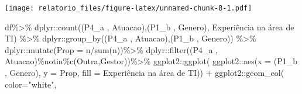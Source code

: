 \documentclass[
]{article}
\newenvironment{Shaded}{\begin{snugshade}}{\end{snugshade}}
\newcommand{\AttributeTok}[1]{\textcolor[rgb]{0.77,0.63,0.00}{#1}}
\newcommand{\FunctionTok}[1]{\textcolor[rgb]{0.00,0.00,0.00}{#1}}
\newcommand{\NormalTok}[1]{#1}
\newcommand{\SpecialCharTok}[1]{\textcolor[rgb]{0.00,0.00,0.00}{#1}}
\newcommand{\StringTok}[1]{\textcolor[rgb]{0.31,0.60,0.02}{#1}}
\begin{document}
\texttt{[image: relatorio\_files/figure-latex/unnamed-chunk-8-1.pdf]}

\begin{Shaded}
\begin{Highlighting}[]
\NormalTok{df}\SpecialCharTok{\%\textgreater{}\%}
\NormalTok{  dplyr}\SpecialCharTok{::}\FunctionTok{count}\NormalTok{(}\StringTok{\textasciigrave{}}\AttributeTok{(\textquotesingle{}P4\_a \textquotesingle{}, \textquotesingle{}Atuacao\textquotesingle{})}\StringTok{\textasciigrave{}}\NormalTok{,}\StringTok{\textasciigrave{}}\AttributeTok{(\textquotesingle{}P1\_b \textquotesingle{}, \textquotesingle{}Genero\textquotesingle{})}\StringTok{\textasciigrave{}}\NormalTok{, }\StringTok{\textasciigrave{}}\AttributeTok{Experiência na área de TI}\StringTok{\textasciigrave{}}\NormalTok{) }\SpecialCharTok{\%\textgreater{}\%}
\NormalTok{  dplyr}\SpecialCharTok{::}\FunctionTok{group\_by}\NormalTok{(}\StringTok{\textasciigrave{}}\AttributeTok{(\textquotesingle{}P4\_a \textquotesingle{}, \textquotesingle{}Atuacao\textquotesingle{})}\StringTok{\textasciigrave{}}\NormalTok{,}\StringTok{\textasciigrave{}}\AttributeTok{(\textquotesingle{}P1\_b \textquotesingle{}, \textquotesingle{}Genero\textquotesingle{})}\StringTok{\textasciigrave{}}\NormalTok{) }\SpecialCharTok{\%\textgreater{}\%}
\NormalTok{  dplyr}\SpecialCharTok{::}\FunctionTok{mutate}\NormalTok{(}\AttributeTok{Prop =}\NormalTok{ n}\SpecialCharTok{/}\FunctionTok{sum}\NormalTok{(n))}\SpecialCharTok{\%\textgreater{}\%}
\NormalTok{  dplyr}\SpecialCharTok{::}\FunctionTok{filter}\NormalTok{(}\StringTok{\textasciigrave{}}\AttributeTok{(\textquotesingle{}P4\_a \textquotesingle{}, \textquotesingle{}Atuacao\textquotesingle{})}\StringTok{\textasciigrave{}}\SpecialCharTok{\%notin\%}\FunctionTok{c}\NormalTok{(}\StringTok{\textquotesingle{}Outra\textquotesingle{}}\NormalTok{,}\StringTok{\textquotesingle{}Gestor\textquotesingle{}}\NormalTok{))}\SpecialCharTok{\%\textgreater{}\%}
\NormalTok{  ggplot2}\SpecialCharTok{::}\FunctionTok{ggplot}\NormalTok{(}
\NormalTok{    ggplot2}\SpecialCharTok{::}\FunctionTok{aes}\NormalTok{(}\AttributeTok{x =} \StringTok{\textasciigrave{}}\AttributeTok{(\textquotesingle{}P1\_b \textquotesingle{}, \textquotesingle{}Genero\textquotesingle{})}\StringTok{\textasciigrave{}}\NormalTok{, }\AttributeTok{y =}\NormalTok{ Prop,}
                 \AttributeTok{fill =} \StringTok{\textasciigrave{}}\AttributeTok{Experiência na área de TI}\StringTok{\textasciigrave{}}\NormalTok{)) }\SpecialCharTok{+}
\NormalTok{  ggplot2}\SpecialCharTok{::}\FunctionTok{geom\_col}\NormalTok{( }\AttributeTok{color=}\StringTok{"white"}\NormalTok{,}

\end{Highlighting}
\end{Shaded}
\end{document}
